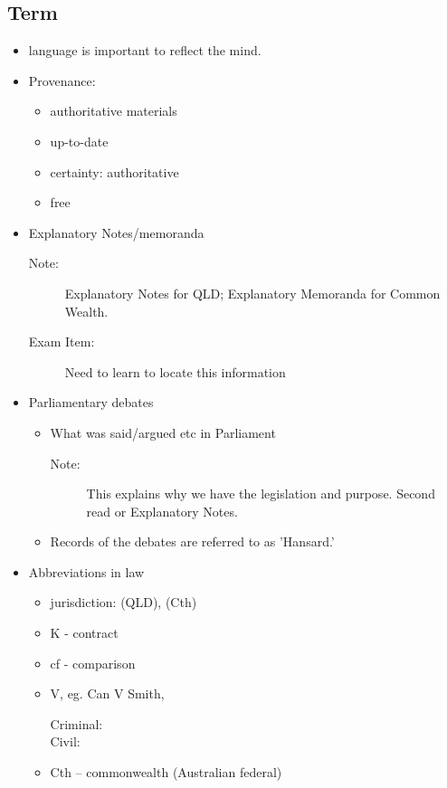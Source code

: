 \subsection*{Term}
\begin{itemize}
    \item language is important to reflect the mind. 
    \item Provenance: 
        \begin{itemize}
            \item authoritative materials
            \item up-to-date
            \item certainty: authoritative
            \item free
        \end{itemize}
    \item Explanatory Notes/memoranda
        \begin{description}
     		\item[Note:] Explanatory Notes for QLD; Explanatory Memoranda for Common Wealth. 
                \item [Exam Item:] Need to learn to locate this information
         \end{description}
    \item Parliamentary debates
        \begin{itemize}
            \item What was said/argued etc in Parliament
                \begin{description}
                    \item[Note:] This explains why we have the legislation and purpose. Second read or Explanatory Notes.
                \end{description}
            \item Records of the debates are referred to as 'Hansard.'
        \end{itemize}
    \item Abbreviations in law
        \begin{itemize}
            \item jurisdiction: (QLD), (Cth)
            \item K - contract
            \item cf - comparison 
            \item V, eg. Can V Smith, 
                \begin{description}
                    \item[Criminal:]
                    \item[Civil:]
                \end{description}
            \item Cth -- commonwealth (Australian federal)
        \end{itemize}
          
\end{itemize}

